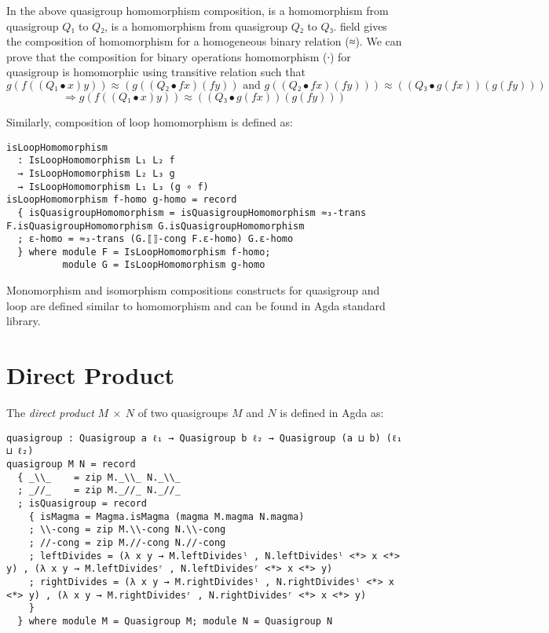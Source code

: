 In the above quasigroup homomorphism composition,  is a homomorphism
from quasigroup $Q₁$ to $Q₂$,  is a homomorphism from quasigroup $Q₂$ to $Q₃$.
 field gives the composition of homomorphism for a
homogeneous binary relation (≈). We can prove that the composition for binary
operations homomorphism (∙) for quasigroup is homomorphic using transitive
relation  such that \[g (f ((Q₁ ∙ x) y)) ≈ (g ((Q₂ ∙ f x) (f
y)) \text{ and } g ((Q₂ ∙ f x) (f y))) ≈ ((Q₃ ∙ g (f x)) (g (f y)))\]
\[\Rightarrow g (f ((Q₁ ∙ x) y)) ≈ ((Q₃ ∙ g (f x)) (g (f y)))\]

Similarly, composition of loop homomorphism is defined as:

\begin{verbatim}
isLoopHomomorphism
  : IsLoopHomomorphism L₁ L₂ f
  → IsLoopHomomorphism L₂ L₃ g
  → IsLoopHomomorphism L₁ L₃ (g ∘ f)
isLoopHomomorphism f-homo g-homo = record
  { isQuasigroupHomomorphism = isQuasigroupHomomorphism ≈₃-trans F.isQuasigroupHomomorphism G.isQuasigroupHomomorphism
  ; ε-homo = ≈₃-trans (G.⟦⟧-cong F.ε-homo) G.ε-homo
  } where module F = IsLoopHomomorphism f-homo; 
          module G = IsLoopHomomorphism g-homo
\end{verbatim}

Monomorphism and isomorphism compositions constructs for quasigroup and loop are
defined similar to homomorphism and can be found in Agda standard library.

\section{Direct Product}
The \textit{direct product} $M \ \times \ N$ of two quasigroups $M$ and $N$ is
defined in Agda as:

\begin{verbatim}
quasigroup : Quasigroup a ℓ₁ → Quasigroup b ℓ₂ → Quasigroup (a ⊔ b) (ℓ₁ ⊔ ℓ₂)
quasigroup M N = record
  { _\\_    = zip M._\\_ N._\\_
  ; _//_    = zip M._//_ N._//_
  ; isQuasigroup = record
    { isMagma = Magma.isMagma (magma M.magma N.magma)
    ; \\-cong = zip M.\\-cong N.\\-cong
    ; //-cong = zip M.//-cong N.//-cong
    ; leftDivides = (λ x y → M.leftDividesˡ , N.leftDividesˡ <*> x <*> y) , (λ x y → M.leftDividesʳ , N.leftDividesʳ <*> x <*> y)
    ; rightDivides = (λ x y → M.rightDividesˡ , N.rightDividesˡ <*> x <*> y) , (λ x y → M.rightDividesʳ , N.rightDividesʳ <*> x <*> y)
    }
  } where module M = Quasigroup M; module N = Quasigroup N
\end{verbatim}

